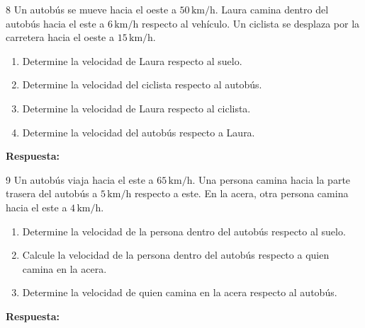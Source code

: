 \documentclass[11pt,letterpaper]{article}
\newcommand{\espacio}[1]{\par\vspace{#1}\par}
\newcommand{\renglon}{\par\textcolor{morado}{\bfseries Respuesta:}\ \dotfill\par}
\begin{document}
\clearpage
\begin{problema}{8}
Un autobús se mueve hacia el oeste a $50\,\mathrm{km/h}$. Laura camina dentro del autobús hacia el este a $6\,\mathrm{km/h}$ respecto al vehículo. Un ciclista se desplaza por la carretera hacia el oeste a $15\,\mathrm{km/h}$.
\begin{enumerate}[label=\alph*)]
\item Determine la velocidad de Laura respecto al suelo.
\item Determine la velocidad del ciclista respecto al autobús.
\item Determine la velocidad de Laura respecto al ciclista.
\item Determine la velocidad del autobús respecto a Laura.
\end{enumerate}
\espacio{5cm}\renglon
\end{problema}
\begin{problema}{9}
Un autobús viaja hacia el este a $65\,\mathrm{km/h}$. Una persona camina hacia la parte trasera del autobús a $5\,\mathrm{km/h}$ respecto a este. En la acera, otra persona camina hacia el este a $4\,\mathrm{km/h}$.
\begin{enumerate}[label=\alph*)]
\item Determine la velocidad de la persona dentro del autobús respecto al suelo.
\item Calcule la velocidad de la persona dentro del autobús respecto a quien camina en la acera.
\item Determine la velocidad de quien camina en la acera respecto al autobús.
\end{enumerate}
\espacio{4.5cm}\renglon
\end{problema}
\clearpage
\end{document}
